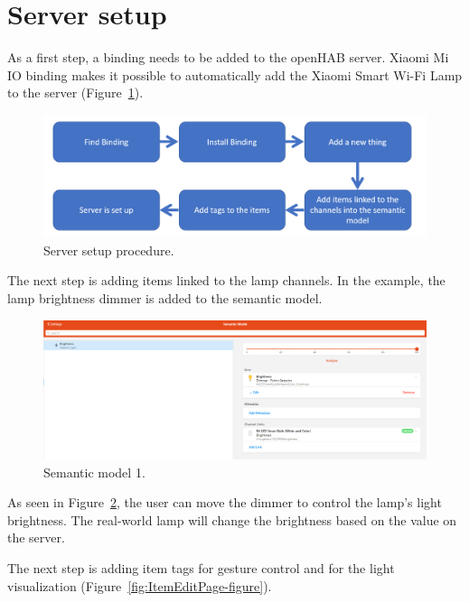 \section{Server setup}
As a first step, a binding needs to be added to the openHAB server. Xiaomi Mi IO binding makes it possible to automatically add the Xiaomi Smart Wi-Fi Lamp to the server (Figure~\ref{fig:ServerSetupProcedure-figure}).

\begin{figure}
  \centering
  \includegraphics[width = 0.9 \linewidth]{figures/ServerSetupProcedure.png}
  \caption{Server setup procedure.}
  \label{fig:ServerSetupProcedure-figure}
\end{figure}

The next step is adding items linked to the lamp channels. In the example, the lamp brightness dimmer is added to the semantic model.

\begin{figure}
  \centering
  \includegraphics[width = 0.9 \linewidth]{figures/SemanticModelOne.png}
  \caption{Semantic model 1.}
  \label{fig:SemanticModelOne-figure}
\end{figure}

As seen in Figure~\ref{fig:SemanticModelOne-figure}, the user can move the dimmer to control the lamp's light brightness. The real-world lamp will change the brightness based on the value on the server.

The next step is adding item tags for gesture control and for the light visualization (Figure~\ref{fig:ItemEditPage-figure}).

